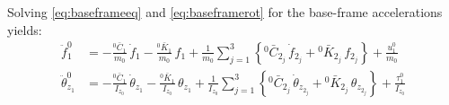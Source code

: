 \documentclass[11pt]{article}
\theoremstyle{definition}
\begin{document}
Solving \eqref{eq:baseframeeq} and \eqref{eq:baseframerot} for the base-frame accelerations yields:
\begin{align}
    \ddot{f}^{0}_{1}
    &= -\frac{{}^0\bar{C}_1}{m_0}\,\dot{f}_1
       -\frac{{}^0\bar{K}_1}{m_0}\,f_1
       +\frac{1}{m_0}\sum_{j=1}^{3}\left\{
           {}^0\bar{C}_{2_j}\,\dot{f}_{2_j} + {}^0\bar{K}_{2_j}\,f_{2_j}
       \right\}
       +\frac{u^0_{1}}{m_0} \label{eq:f1ddot} \\[4pt]
    \ddot{\theta}^{0}_{z_1}
    &= -\frac{{}^0\bar{C}_1}{I_{z_0}}\,\dot{\theta}_{z_1}
       -\frac{{}^0\bar{K}_1}{I_{z_0}}\,\theta_{z_1}
       +\frac{1}{I_{z_0}}\sum_{j=1}^{3}\left\{
           {}^0\bar{C}_{2_j}\,\dot{\theta}_{z_{2_j}} + {}^0\bar{K}_{2_j}\,\theta_{z_{2_j}}
       \right\}
       +\frac{\tau^0_{1}}{I_{z_0}} \label{eq:th1ddot}
\end{align}
\end{document}
